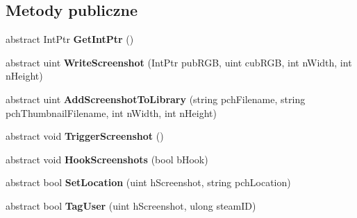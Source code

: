 \subsection*{Metody publiczne}
\begin{DoxyCompactItemize}
\item 
\mbox{\label{class_valve_1_1_steamworks_1_1_i_steam_screenshots_a30cb9c9e22c0145ccb7e844b004c18ec}} 
abstract Int\+Ptr {\bfseries Get\+Int\+Ptr} ()
\item 
\mbox{\label{class_valve_1_1_steamworks_1_1_i_steam_screenshots_ab522b5bce4b593cb0e77fe62ab759d1d}} 
abstract uint {\bfseries Write\+Screenshot} (Int\+Ptr pub\+R\+GB, uint cub\+R\+GB, int n\+Width, int n\+Height)
\item 
\mbox{\label{class_valve_1_1_steamworks_1_1_i_steam_screenshots_a2fbefec332b225c85f389a4cfd94ec23}} 
abstract uint {\bfseries Add\+Screenshot\+To\+Library} (string pch\+Filename, string pch\+Thumbnail\+Filename, int n\+Width, int n\+Height)
\item 
\mbox{\label{class_valve_1_1_steamworks_1_1_i_steam_screenshots_a8f5a2618e93eae0a73c6daf1b9b2d812}} 
abstract void {\bfseries Trigger\+Screenshot} ()
\item 
\mbox{\label{class_valve_1_1_steamworks_1_1_i_steam_screenshots_a34e9b7f64677765b85f1f6199dd4da78}} 
abstract void {\bfseries Hook\+Screenshots} (bool b\+Hook)
\item 
\mbox{\label{class_valve_1_1_steamworks_1_1_i_steam_screenshots_a5f6c64025fcc0917ce4699cd89fc93f1}} 
abstract bool {\bfseries Set\+Location} (uint h\+Screenshot, string pch\+Location)
\item 
\mbox{\label{class_valve_1_1_steamworks_1_1_i_steam_screenshots_ac9ffb9f3c3743bc81d76b21145fe010d}} 
abstract bool {\bfseries Tag\+User} (uint h\+Screenshot, ulong steam\+ID)
\item 
\mbox{\label{class_valve_1_1_steamworks_1_1_i_steam_screenshots_a1ebe388e2f10f44c96575f2894543824}} 

\end{DoxyCompactItemize}
